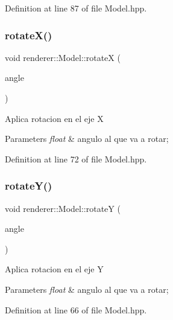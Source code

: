 Definition at line 87 of file Model.\+hpp.

\mbox{\label{classrenderer_1_1_model_ab9f8435be21c68241138f3ccea924ad8}} 
\subsubsection{\texorpdfstring{rotateX()}{rotateX()}}
{\footnotesize\ttfamily void renderer\+::\+Model\+::rotateX (\begin{DoxyParamCaption}\item[{float}]{angle }\end{DoxyParamCaption})\hspace{0.3cm}{\ttfamily [inline]}}

Aplica rotacion en el eje X 
\begin{DoxyParams}{Parameters}
{\em float} & angulo al que va a rotar; \\
\hline
\end{DoxyParams}


Definition at line 72 of file Model.\+hpp.

\mbox{\label{classrenderer_1_1_model_af7da088f74cd608807beff747801f035}} 
\subsubsection{\texorpdfstring{rotateY()}{rotateY()}}
{\footnotesize\ttfamily void renderer\+::\+Model\+::rotateY (\begin{DoxyParamCaption}\item[{float}]{angle }\end{DoxyParamCaption})\hspace{0.3cm}{\ttfamily [inline]}}

Aplica rotacion en el eje Y 
\begin{DoxyParams}{Parameters}
{\em float} & angulo al que va a rotar; \\
\hline
\end{DoxyParams}


Definition at line 66 of file Model.\+hpp.

\mbox{\label{classrenderer_1_1_model_a47dd52d773bbcde8c2eceb704e904e4b}} 
